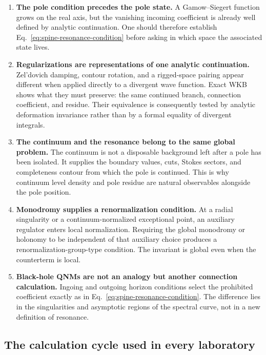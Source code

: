 \begin{enumerate}
  \item \textbf{The pole condition precedes the pole state.}
  A Gamow--Siegert function grows on the real axis, but the vanishing incoming
  coefficient is already well defined by analytic continuation.  One should
  therefore establish Eq.~\eqref{eq:spine-resonance-condition} before asking
  in which space the associated state lives.

  \item \textbf{Regularizations are representations of one analytic
  continuation.}
  Zel'dovich damping, contour rotation, and a rigged-space pairing appear
  different when applied directly to a divergent wave function.  Exact WKB
  shows what they must preserve: the same continued branch, connection
  coefficient, and residue.  Their equivalence is consequently tested by
  analytic deformation invariance rather than by a formal equality of
  divergent integrals.

  \item \textbf{The continuum and the resonance belong to the same global
  problem.}
  The continuum is not a disposable background left after a pole has been
  isolated.  It supplies the boundary values, cuts, Stokes sectors, and
  completeness contour from which the pole is continued.  This is why
  continuum level density and pole residue are natural observables alongside
  the pole position.

  \item \textbf{Monodromy supplies a renormalization condition.}
  At a radial singularity or a continuum-normalized exceptional point, an
  auxiliary regulator enters local normalization.  Requiring the global
  monodromy or holonomy to be independent of that auxiliary choice produces
  a renormalization-group-type condition.  The invariant is global even when
  the counterterm is local.

  \item \textbf{Black-hole QNMs are not an analogy but another connection
  calculation.}
  Ingoing and outgoing horizon conditions select the prohibited coefficient
  exactly as in Eq.~\eqref{eq:spine-resonance-condition}.  The difference lies
  in the singularities and asymptotic regions of the spectral curve, not in a
  new definition of resonance.
\end{enumerate}

\subsection{The calculation cycle used in every laboratory}
\label{subsec:calculation-cycle}

